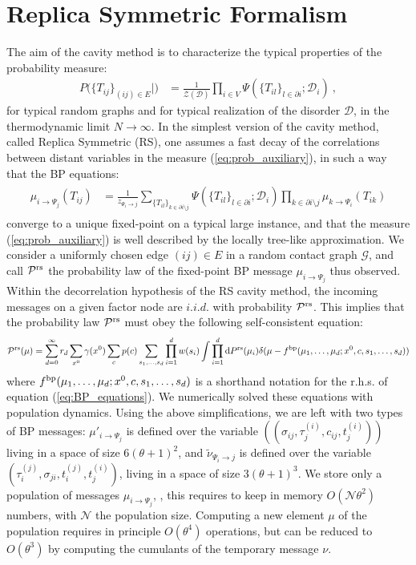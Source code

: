 \documentclass[a4paper, amsfonts, amssymb, amsmath, reprint, showkeys, nofootinbib, twoside, floatfix, pre,superscriptaddress, onecolumn]{revtex4-2}
\begin{document}
\section{Replica Symmetric Formalism} 
The aim of the cavity method is to characterize the typical properties of the probability measure:
\begin{align}
\label{eq:prob_auxiliary}
P(\{T_{ij}\}_{(ij)\in E}|\mathcal) &= \frac{1}{\mathcal{Z}(\mathcal{D})}\prod_{i\in V}\Psi(\{T_{il}\}_{l\in\partial i};\mathcal{D}_i) \ ,
\end{align}
for typical random graphs and for typical realization of the disorder $\mathcal{D}$, in the thermodynamic limit $N\to\infty$.
In the simplest version of the cavity method, called Replica Symmetric (RS), one assumes a fast decay of the correlations between distant variables in the measure (\ref{eq:prob_auxiliary}), in such a way that the BP equations:
\begin{align}
\label{eq:BP_equations}
\begin{aligned}
\mu_{i\to \Psi_j}(T_{ij}) &= \frac{1}{z_{\Psi_i\to j}}\sum_{\{T_{il}\}_{k\in\partial i \setminus j}}\Psi(\{T_{il}\}_{l\in\partial i};\mathcal{D}_i)\prod_{k\in\partial i \setminus j}\mu_{k\to\Psi_i}(T_{ik})
\end{aligned}
\end{align}
converge to a unique fixed-point on a typical large instance, and that the measure (\ref{eq:prob_auxiliary}) is well described by the locally tree-like approximation.
We consider a uniformly chosen edge $(ij)\in E$ in a random contact graph $\mathcal{G}$, and call $\mathcal{P}^{\rm rs}$ the probability law of the fixed-point BP message $\mu_{i\to \Psi_j}$ thus observed.
Within the decorrelation hypothesis of the RS cavity method, the incoming messages on a given factor node are $i.i.d.$ with probability $\mathcal{P}^{\rm rs}$.
This implies that the probability law $\mathcal{P}^{\rm rs}$ must obey the following self-consistent equation:
	\begin{align}
	\mathcal{P}^{\rm rs}(\mu) = \sum_{d=0}^\infty r_d\sum_{x^0}\gamma(x^0)\sum_c p(c)\sum_{s_1,\dots,s_d}\prod_{i=1}^dw(s_i)\int\prod_{i=1}^d{\rm d}P^{\rm rs}(\mu_i)\delta(\mu - f^{\rm bp}(\mu_1,\dots,\mu_d;x^0,c,s_1,\dots,s_d))
	\end{align}
where $f^{\rm bp}(\mu_1,\dots,\mu_d;x^0,c,s_1,\dots,s_d)$ is a shorthand notation for the r.h.s. of equation (\ref{eq:BP_equations}).
We numerically solved these equations with population dynamics.
Using the above simplifications, we are left with two types of BP messages: $\mu'_{i\to\Psi_j}$ is defined over the variable $((\sigma_{ij},\tau_j^{(i)},c_{ij},t_j^{(i)}))$ living in a space of size $6(\theta+1)^2$, and $\tilde{\nu}_{\Psi_i\to j}$ is defined over the variable $(\tau_i^{(j)},\sigma_{ji},t_i^{(j)},t_j^{(i)})$, living in a space of size $3(\theta+1)^3$.
We store only a population of messages $\mu_{i\to \Psi_j}$, , this requires to keep in memory $O(\mathcal{N}\theta^2)$ numbers, with $\mathcal{N}$ the population size.
Computing a new element $\mu$ of the population requires in principle $O(\theta^4)$ operations, but can be reduced to $O(\theta^3)$ by computing the cumulants of the temporary message $\nu$.
\end{document}
